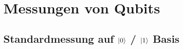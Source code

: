 \documentclass[12pt]{report}
\begin{document}
\section{Messungen von Qubits}
\subsection{Standardmessung auf $\ket{0}$ / $\ket{1}$ Basis}	%

\end{document}
